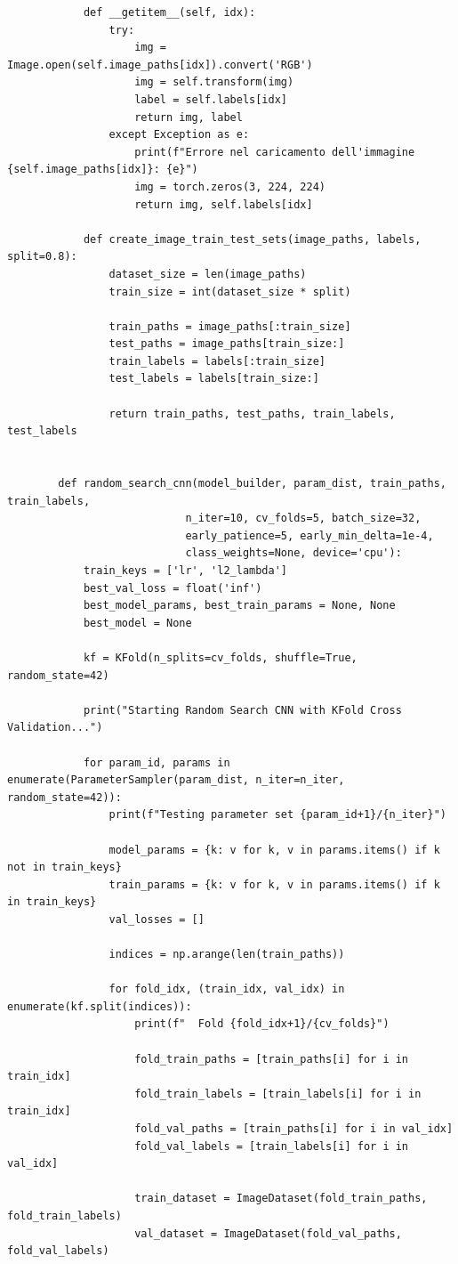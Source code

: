 \documentclass[a4paper,12pt]{report}
\begin{document}
\begin{verbatim}
			def __getitem__(self, idx):
				try:
					img = Image.open(self.image_paths[idx]).convert('RGB')
					img = self.transform(img)
					label = self.labels[idx]
					return img, label
				except Exception as e:
					print(f"Errore nel caricamento dell'immagine {self.image_paths[idx]}: {e}")
					img = torch.zeros(3, 224, 224)
					return img, self.labels[idx]
			
			def create_image_train_test_sets(image_paths, labels, split=0.8):
				dataset_size = len(image_paths)
				train_size = int(dataset_size * split)
				
				train_paths = image_paths[:train_size]
				test_paths = image_paths[train_size:]
				train_labels = labels[:train_size]
				test_labels = labels[train_size:]
				
				return train_paths, test_paths, train_labels, test_labels
			
		
		def random_search_cnn(model_builder, param_dist, train_paths, train_labels,
							n_iter=10, cv_folds=5, batch_size=32,
							early_patience=5, early_min_delta=1e-4,
							class_weights=None, device='cpu'):
			train_keys = ['lr', 'l2_lambda']
			best_val_loss = float('inf')
			best_model_params, best_train_params = None, None
			best_model = None
			
			kf = KFold(n_splits=cv_folds, shuffle=True, random_state=42)
			
			print("Starting Random Search CNN with KFold Cross Validation...")
			
			for param_id, params in enumerate(ParameterSampler(param_dist, n_iter=n_iter, random_state=42)):
				print(f"Testing parameter set {param_id+1}/{n_iter}")
				
				model_params = {k: v for k, v in params.items() if k not in train_keys}
				train_params = {k: v for k, v in params.items() if k in train_keys}
				val_losses = []
				
				indices = np.arange(len(train_paths))
				
				for fold_idx, (train_idx, val_idx) in enumerate(kf.split(indices)):
					print(f"  Fold {fold_idx+1}/{cv_folds}")
					
					fold_train_paths = [train_paths[i] for i in train_idx]
					fold_train_labels = [train_labels[i] for i in train_idx]
					fold_val_paths = [train_paths[i] for i in val_idx]
					fold_val_labels = [train_labels[i] for i in val_idx]
					
					train_dataset = ImageDataset(fold_train_paths, fold_train_labels)
					val_dataset = ImageDataset(fold_val_paths, fold_val_labels)
					

\end{verbatim}
\end{document}
